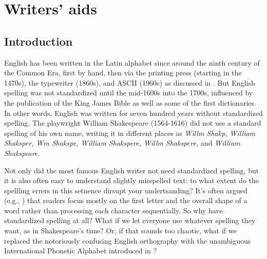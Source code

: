 \chapter{Writers' aids}
\label{ch:writers-aids}

\section{Introduction}
\label{sec:intro}








English has been written in the Latin alphabet since around the ninth century of the Common Era, first by hand, then via the printing press (starting in the 1470s), the typewriter (1860s), and ASCII (1960s) as discussed in .
But English spelling was not standardized until the mid-1600s into the 1700s, influenced by the publication of the King James Bible as well as some of the first dictionaries.  In other words, English was written for seven hundred years without standardized spelling.  The playwright William Shakespeare (1564-1616) did not use a standard spelling of his own name, writing it in different places as \textit{Willm Shakp, William Shaksper, Wm Shakspe, William Shakspere, Willm Shakspere,} and  \textit{William Shakspeare}.


Not only did the most famous English writer not need standardized spelling, but it is also often easy to understand slightly misspelled text: to what extent do the spellling errers in this setnence dirsupt your undertsanding?  It's often argued (e.g., \citealt{White-etal:2008}) that readers focus mostly on the first letter and the overall shape of a word rather than processing each character sequentially.  So why have standardized spelling at all?  What if we let everyone use whatever spelling they want, as  in Shakespeare's time?  Or, if that sounds too chaotic, what if we replaced the notoriously confusing English orthography with the unambiguous International Phonetic Alphabet introduced in ?

